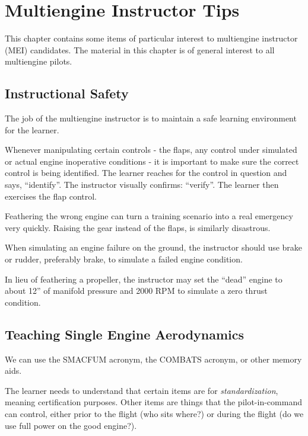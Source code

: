 
\chapter{Multiengine Instructor Tips}

This chapter contains some items of particular interest to multiengine instructor (MEI) candidates.
The material in this chapter is of general interest to all multiengine pilots.

\section{Instructional Safety}

The job of the multiengine instructor is to maintain a safe learning environment for the learner.

Whenever manipulating certain controls - the flaps, any control under simulated or actual engine inoperative conditions -
it is important to make sure the correct control is being identified. The learner reaches for the control in question and
says, ``identify''. The instructor visually confirms: ``verify''. The learner then exercises the flap control.

Feathering the wrong engine can turn a training scenario into a real emergency very quickly. Raising the gear
instead of the flaps, is similarly disastrous.

When simulating an engine failure on the ground, the instructor should use brake or rudder, preferably brake,
to simulate a failed engine condition.

In lieu of feathering a propeller, the instructor may set the ``dead'' engine to about 12'' of manifold pressure
and 2000 RPM to simulate a zero thrust condition.

\section{Teaching Single Engine Aerodynamics}

We can use the SMACFUM acronym, the COMBATS acronym, or other memory aids.

The learner needs to understand that certain items are for \emph{standardization}, meaning
certification purposes. Other items are things that the pilot-in-command can control, either prior
to the flight (who sits where?) or during the flight (do we use full power on the good engine?).


